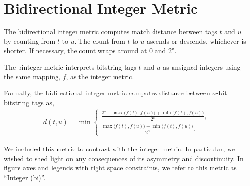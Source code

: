 \section{Bidirectional Integer Metric} \label{sec:bidirectionalinteger}

The bidirectional integer metric computes match distance between tags $t$ and $u$ by counting from $t$ to $u$.
The count from $t$ to $u$ ascends or descends, whichever is shorter.
If necessary, the count wraps around at $0$ and $2^n$.

The binteger metric interprets bitstring tags $t$ and $u$ as unsigned integers using the same mapping, $f$, as the integer metric.

Formally, the bidirectional integer metric computes distance between $n$-bit bitstring tags as,
\begin{align*}
d(t, u) =
\min
\begin{cases}
  \frac{2^n - \max\big(f(t), f(u)\big) + \min\big(f(t), f(u)\big)}{2^n}, \\
  \frac{\max\big(f(t), f(u)\big) - \min\big(f(t), f(u)\big)}{2^n}.
\end{cases}
\end{align*}

We included this metric to contrast with the integer metric. In particular, we wished to shed light on any consequences of its asymmetry and discontinuity.
In figure axes and legends with tight space constraints, we refer to this metric as ``Integer (bi)''.
